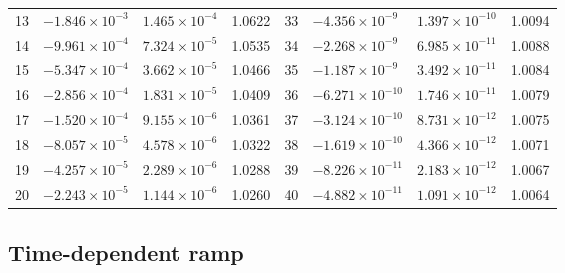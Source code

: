 \documentclass[11pt]{article}
\begin{document}
\begin{center}
\begin{tabular}{@{}rlll@{\qquad}rlll@{}}
13 & $-1.846\times10^{-3}$ & $1.465\times10^{-4}$ & 1.0622 & 33 & $-4.356\times10^{-9}$ & $1.397\times10^{-10}$ & 1.0094 \\
14 & $-9.961\times10^{-4}$ & $7.324\times10^{-5}$ & 1.0535 & 34 & $-2.268\times10^{-9}$ & $6.985\times10^{-11}$ & 1.0088 \\
15 & $-5.347\times10^{-4}$ & $3.662\times10^{-5}$ & 1.0466 & 35 & $-1.187\times10^{-9}$ & $3.492\times10^{-11}$ & 1.0084 \\
16 & $-2.856\times10^{-4}$ & $1.831\times10^{-5}$ & 1.0409 & 36 & $-6.271\times10^{-10}$ & $1.746\times10^{-11}$ & 1.0079 \\
17 & $-1.520\times10^{-4}$ & $9.155\times10^{-6}$ & 1.0361 & 37 & $-3.124\times10^{-10}$ & $8.731\times10^{-12}$ & 1.0075 \\
18 & $-8.057\times10^{-5}$ & $4.578\times10^{-6}$ & 1.0322 & 38 & $-1.619\times10^{-10}$ & $4.366\times10^{-12}$ & 1.0071 \\
19 & $-4.257\times10^{-5}$ & $2.289\times10^{-6}$ & 1.0288 & 39 & $-8.226\times10^{-11}$ & $2.183\times10^{-12}$ & 1.0067 \\
20 & $-2.243\times10^{-5}$ & $1.144\times10^{-6}$ & 1.0260 & 40 & $-4.882\times10^{-11}$ & $1.091\times10^{-12}$ & 1.0064 \\
\bottomrule
\end{tabular}
\end{center}

\subsection{Time-dependent ramp}
\end{document}
